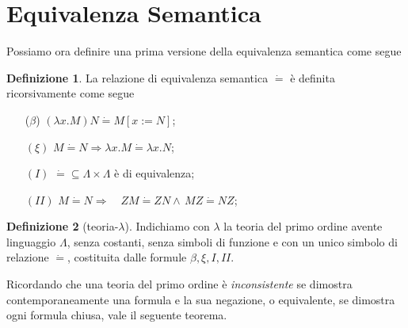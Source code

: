 \documentclass[a4paper,11pt]{article}
\theoremstyle{definition}
\newtheorem{defn}{Definizione}
\begin{document}
\section{Equivalenza Semantica}
Possiamo ora definire una prima versione della equivalenza semantica come segue
\begin{defn}
  La relazione di equivalenza semantica $\dot =$ è definita ricorsivamente
  come segue
  \begin{itemize}
    \item[($\beta$)] $(\lambda x.M)N \dot = M[x:=N]$;
    \item[$(\xi)$] $M\dot = N \Rightarrow \lambda x.M \dot = \lambda x.N$;
    \item[$(I)$] $\dot = \subseteq \Lambda\times\Lambda$ è di equivalenza;
    \item[$(II)$] $M\dot = N \Rightarrow \quad ZM\dot =ZN \wedge\, MZ\dot
      =NZ$;
  \end{itemize}
\end{defn}

\begin{defn}[teoria-$\lambda$]
  Indichiamo con $\lambda$ la teoria del primo ordine avente linguaggio
  $\Lambda$, senza costanti, senza simboli di funzione e con un unico simbolo
  di relazione $\dot =$, costituita dalle formule $\beta,\xi,I,II$.
\end{defn}

Ricordando che una teoria del primo ordine è \textit{inconsistente} se
dimostra contemporaneamente una formula e la sua negazione, o equivalente, se
dimostra ogni formula chiusa, vale il seguente teorema.
\end{document}
